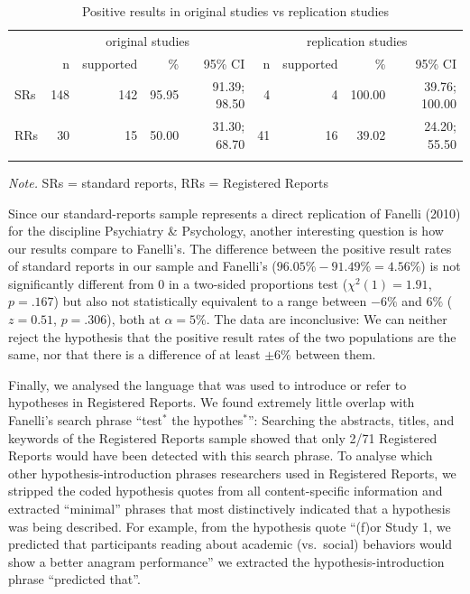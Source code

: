 \documentclass[british,,jou,floatsintext]{apa6}
\begin{document}
\begin{table}[tbp]

\begin{center}
\begin{threeparttable}

\caption{\label{tab:unnamed-chunk-4}Positive results in original studies vs replication studies}

\begin{tabular}{lrrrrrrrr}
\toprule
 & \multicolumn{4}{c}{original studies} & \multicolumn{4}{c}{replication studies} \\
\cmidrule(r){2-5} \cmidrule(r){6-9}
 & n & supported & \% & 95\% CI & n & supported & \% & 95\% CI\\
\midrule
SRs & 148 & 142 & 95.95 & 91.39; 98.50 & 4 & 4 & 100.00 & 39.76; 100.00\\
RRs & 30 & 15 & 50.00 & 31.30; 68.70 & 41 & 16 & 39.02 & 24.20; 55.50\\
\bottomrule
\addlinespace
\end{tabular}

\begin{tablenotes}[para]
\normalsize{\textit{Note.} SRs = standard reports, RRs = Registered Reports}
\end{tablenotes}

\end{threeparttable}
\end{center}

\end{table}

Since our standard-reports sample represents a direct replication of Fanelli (2010) for the discipline Psychiatry \& Psychology, another interesting question is how our results compare to Fanelli's.
The difference between the positive result rates of standard reports in our sample and Fanelli's (\(96.05\% - 91.49\% = 4.56\%\)) is not significantly different from 0 in a two-sided proportions test (\(\chi^2(1) = 1.91\), \(p= .167\)) but also not statistically equivalent to a range between \(-6\%\) and \(6\%\) (\(z = 0.51\), \(p= .306\)), both at \(\alpha = 5\%\).
The data are inconclusive:
We can neither reject the hypothesis that the positive result rates of the two populations are the same, nor that there is a difference of at least \(\pm 6\%\) between them.

Finally, we analysed the language that was used to introduce or refer to hypotheses in Registered Reports.
We found extremely little overlap with Fanelli's search phrase \enquote{test\(^\ast\) the hypothes\(^\ast\)}:
Searching the abstracts, titles, and keywords of the Registered Reports sample showed that only 2/71 Registered Reports would have been detected with this search phrase.
To analyse which other hypothesis-introduction phrases researchers used in Registered Reports, we stripped the coded hypothesis quotes from all content-specific information and extracted \enquote{minimal} phrases that most distinctively indicated that a hypothesis was being described.
For example, from the hypothesis quote \enquote{(f)or Study 1, we predicted that participants reading about academic (vs.~social) behaviors would show a better anagram performance} we extracted the hypothesis-introduction phrase \enquote{predicted that}.
\end{document}
